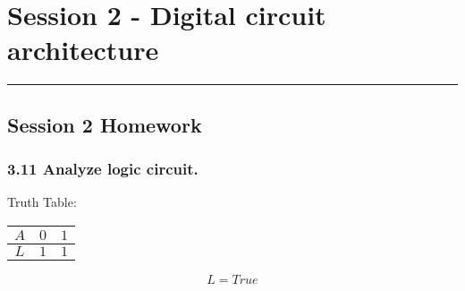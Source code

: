 \section{Session 2 - Digital circuit architecture}
\vspace{-15pt}\noindent\rule{\textwidth}{0.1pt}\vspace{-10pt}
    \subsection*{Session 2 Homework}
    \subsubsection{3.11 \textnormal{Analyze logic circuit}.}
    {\color{hwSolution}
        Truth Table:
        \begin{center}
            \begin{tabular}{c|c c}
                $A$ & $0$ & $1$ \\
                \hline
                $L$ & $1$ & $1$ \\
            \end{tabular}
            \[L = True\]
        \end{center}

}
